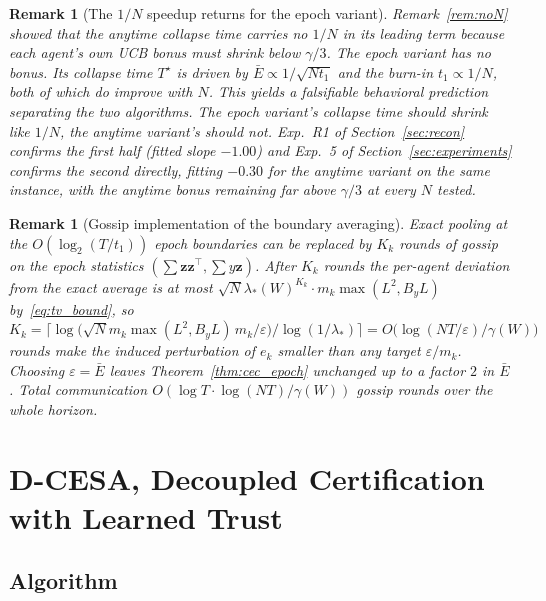 \documentclass[11pt]{article}
\newtheorem{remark}[theorem]{Remark}
\begin{document}
\begin{remark}[The $1/N$ speedup returns for the epoch variant]
\label{rem:epoch_N}
Remark~\ref{rem:noN} showed that the anytime collapse time carries no
$1/N$ in its leading term because each agent's \emph{own} UCB bonus
must shrink below $\gamma/3$.  The epoch variant has no bonus. Its
collapse time $T^\star$ is driven by $\bar E\propto 1/\sqrt{Nt_1}$
and the burn-in $t_1\propto 1/N$, both of which \emph{do} improve
with $N$.  This yields a falsifiable behavioral prediction separating
the two algorithms. The epoch variant's collapse time
should shrink like $1/N$, the anytime variant's should not.  Exp.~R1
of Section~\ref{sec:recon} confirms the first half (fitted slope
$-1.00$) and Exp.~5 of Section~\ref{sec:experiments} confirms the
second directly, fitting $-0.30$ for the anytime variant on the same
instance, with the anytime bonus remaining far above $\gamma/3$ at
every $N$ tested.
\end{remark}

\begin{remark}[Gossip implementation of the boundary averaging]
\label{rem:epoch_gossip}
Exact pooling at the $O(\log_2(T/t_1))$ epoch boundaries can be
replaced by $K_k$ rounds of gossip on the epoch statistics
$(\sum\bm z\bm z^\top,\sum y\bm z)$. After $K_k$ rounds the per-agent
deviation from the exact average is at most
$\sqrt N\lambda_*(W)^{K_k}\cdot m_k\max(L^2,B_yL)$
by~\eqref{eq:tv_bound}, so
$K_k=\bigl\lceil\log\bigl(\sqrt N m_k\max(L^2,B_yL)\,
m_k/\varepsilon\bigr)/\log(1/\lambda_*)\bigr\rceil
=O\bigl(\log(NT/\varepsilon)/\gamma(W)\bigr)$
rounds make the induced perturbation of $e_k$ smaller than any target
$\varepsilon/m_k$. Choosing $\varepsilon=\bar E$ leaves
Theorem~\ref{thm:cec_epoch} unchanged up to a factor $2$ in $\bar E$.
Total communication $O(\log T\cdot\log(NT)/\gamma(W))$ gossip rounds
over the whole horizon.
\end{remark}

\section{D-CESA, Decoupled Certification with Learned Trust}
\label{sec:dcesa}

\subsection{Algorithm}
\end{document}
